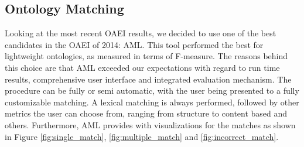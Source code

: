 \documentclass[runningheads,a4paper]{../../StyleFiles/llncs}
\begin{document}
\subsection{Ontology Matching}
\label{Ontology_Matching}
Looking at the most recent OAEI results, we decided to use one of the best candidates in the OAEI of 2014: AML. This tool performed the best for lightweight ontologies, as measured in terms of F-measure. The reasons behind this choice are that AML exceeded our expectations with regard to run time results, comprehensive user interface and integrated evaluation mechanism. The procedure can be fully or semi automatic, with the user being presented to a fully customizable matching. A lexical matching is always performed, followed by other metrics the user can choose from, ranging from structure to content based and others. Furthermore, AML provides with visualizations for the matches as shown in Figure \ref{fig:single_match}, \ref{fig:multiple_match} and \ref{fig:incorrect_match}.
\end{document}
